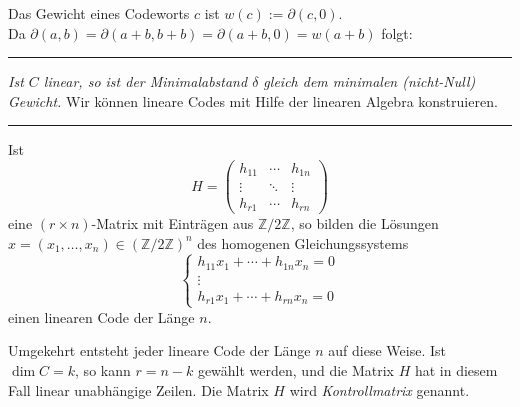 \documentclass[9pt]{article}
\begin{document}
\begin{defi}
Das Gewicht eines Codeworts $c$ ist $w(c) := \partial(c, 0)$.  \\  
Da $\partial(a, b) = \partial(a + b, b + b) = \partial(a + b, 0) = w(a + b)$ folgt:   
\end{defi} \noindent \rule{8cm}{0.4pt}

\begin{lem}
\textit{Ist $C$ linear, so ist der Minimalabstand $\delta$ gleich dem minimalen (nicht-Null) Gewicht. } 
Wir können lineare Codes mit Hilfe der linearen Algebra konstruieren.  
\end{lem} \noindent \rule{8cm}{0.4pt}

\begin{satz}
Ist  
\[
H = \begin{pmatrix}
h_{11} & \cdots & h_{1n} \\
\vdots & \ddots & \vdots \\
h_{r1} & \cdots & h_{rn}
\end{pmatrix}
\]
eine $(r \times n)$-Matrix mit Einträgen aus $\mathbb{Z}/2\mathbb{Z}$, so bilden die Lösungen $x = (x_1, \dots, x_n) \in (\mathbb{Z}/2\mathbb{Z})^n$ des homogenen Gleichungssystems  
\[
\begin{cases}
h_{11}x_1 + \cdots + h_{1n}x_n = 0 \\
\vdots \\
h_{r1}x_1 + \cdots + h_{rn}x_n = 0
\end{cases}
\]
einen linearen Code der Länge $n$.  

Umgekehrt entsteht jeder lineare Code der Länge $n$ auf diese Weise. Ist $\dim C = k$, so kann $r = n - k$ gewählt werden, und die Matrix $H$ hat in diesem Fall linear unabhängige Zeilen.  
Die Matrix $H$ wird \textit{Kontrollmatrix} genannt.   \\
\\


\end{satz}
\end{document}
